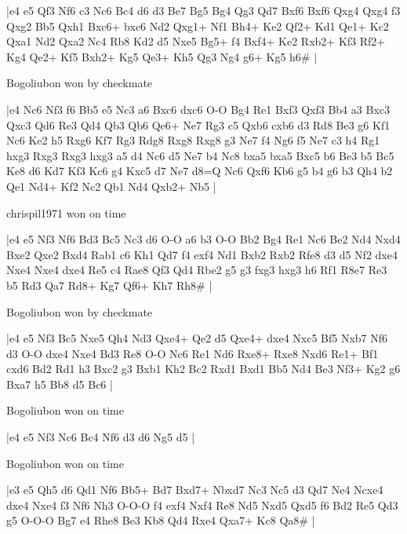 \makegametitle
|e4 e5 Qf3 Nf6 c3 Nc6 Bc4 d6 d3 Be7 Bg5 Bg4 Qg3 Qd7 Bxf6 Bxf6 Qxg4 Qxg4 f3 Qxg2 Bb5 Qxh1 Bxc6+ bxc6 Nd2 Qxg1+ Nf1 Bh4+ Ke2 Qf2+ Kd1 Qe1+ Kc2 Qxa1 Nd2 Qxa2 Nc4 Rb8 Kd2 d5 Nxe5 Bg5+ f4 Bxf4+ Ke2 Rxb2+ Kf3 Rf2+ Kg4 Qe2+ Kf5 Bxh2+ Kg5 Qe3+ Kh5 Qg3 Ng4 g6+ Kg5 h6\#  |

\showboard

Bogoliubon won by checkmate

\makegametitle
|e4 Nc6 Nf3 f6 Bb5 e5 Nc3 a6 Bxc6 dxc6 O-O Bg4 Re1 Bxf3 Qxf3 Bb4 a3 Bxc3 Qxc3 Qd6 Re3 Qd4 Qb3 Qb6 Qe6+ Ne7 Rg3 c5 Qxb6 cxb6 d3 Rd8 Be3 g6 Kf1 Nc6 Ke2 h5 Rxg6 Kf7 Rg3 Rdg8 Rxg8 Rxg8 g3 Ne7 f4 Ng6 f5 Ne7 c3 h4 Rg1 hxg3 Rxg3 Rxg3 hxg3 a5 d4 Nc6 d5 Ne7 b4 Nc8 bxa5 bxa5 Bxc5 b6 Be3 b5 Bc5 Ke8 d6 Kd7 Kf3 Kc6 g4 Kxc5 d7 Ne7 d8=Q Nc6 Qxf6 Kb6 g5 b4 g6 b3 Qh4 b2 Qe1 Nd4+ Kf2 Nc2 Qb1 Nd4 Qxb2+ Nb5  |

\showboard

chrispil1971 won on time

\makegametitle
|e4 e5 Nf3 Nf6 Bd3 Bc5 Nc3 d6 O-O a6 b3 O-O Bb2 Bg4 Re1 Nc6 Be2 Nd4 Nxd4 Bxe2 Qxe2 Bxd4 Rab1 c6 Kh1 Qd7 f4 exf4 Nd1 Bxb2 Rxb2 Rfe8 d3 d5 Nf2 dxe4 Nxe4 Nxe4 dxe4 Re5 c4 Rae8 Qf3 Qd4 Rbe2 g5 g3 fxg3 hxg3 h6 Rf1 R8e7 Re3 b5 Rd3 Qa7 Rd8+ Kg7 Qf6+ Kh7 Rh8\#  |

\showboard

Bogoliubon won by checkmate

\makegametitle
|e4 e5 Nf3 Bc5 Nxe5 Qh4 Nd3 Qxe4+ Qe2 d5 Qxe4+ dxe4 Nxc5 Bf5 Nxb7 Nf6 d3 O-O dxe4 Nxe4 Bd3 Re8 O-O Nc6 Re1 Nd6 Rxe8+ Rxe8 Nxd6 Re1+ Bf1 cxd6 Bd2 Rd1 h3 Bxc2 g3 Bxb1 Kh2 Bc2 Rxd1 Bxd1 Bb5 Nd4 Be3 Nf3+ Kg2 g6 Bxa7 h5 Bb8 d5 Bc6  |

\showboard

Bogoliubon won on time

\makegametitle
|e4 e5 Nf3 Nc6 Bc4 Nf6 d3 d6 Ng5 d5  |

\showboard

Bogoliubon won on time

\makegametitle
|e3 e5 Qh5 d6 Qd1 Nf6 Bb5+ Bd7 Bxd7+ Nbxd7 Nc3 Nc5 d3 Qd7 Ne4 Ncxe4 dxe4 Nxe4 f3 Nf6 Nh3 O-O-O f4 exf4 Nxf4 Re8 Nd5 Nxd5 Qxd5 f6 Bd2 Re5 Qd3 g5 O-O-O Bg7 e4 Rhe8 Be3 Kb8 Qd4 Rxe4 Qxa7+ Kc8 Qa8\#  |

